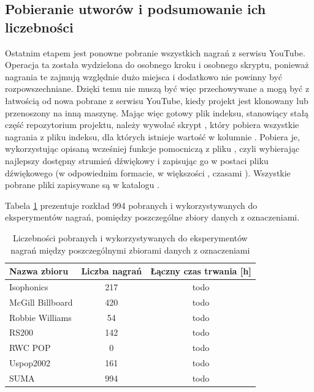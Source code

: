 \subsection{Pobieranie utworów i podsumowanie ich liczebności}
Ostatnim etapem jest ponowne pobranie wszystkich nagrań z serwisu YouTube. Operacja ta została
wydzielona do osobnego kroku i osobnego skryptu, ponieważ nagrania te zajmują względnie dużo miejsca
i dodatkowo nie powinny być rozpowszechniane. Dzięki temu nie muszą być więc przechowywane a mogą
być z łatwością od nowa pobrane z serwisu YouTube, kiedy projekt jest klonowany lub przenoszony na
inną maszynę. Mając więc gotowy plik indeksu, stanowiący stałą część repozytorium projektu, należy
wywołać skrypt , który pobiera wszystkie nagrania z
pliku indeksu, dla których istnieje wartość w kolumnie . Pobiera je, wykorzystując
opisaną wcześniej funkcje pomocniczą z pliku , czyli
wybierając najlepszy dostępny strumień dźwiękowy i zapisując go w postaci pliku dźwiękowego (w
odpowiednim formacie, w większości , czasami ). Wszystkie pobrane pliki
zapisywane są w katalogu .

Tabela \ref{tab:datasets2} prezentuje rozkład 994 pobranych i wykorzystywanych do eksperymentów
nagrań, pomiędzy poszczególne zbiory danych z oznaczeniami.

\begin{table}
    \centering
    \caption{Liczebności pobranych i wykorzystywanych do eksperymentów nagrań między poszczególnymi zbiorami danych z oznaczeniami}
    \label{tab:datasets2}
    \begin{tabular}{|l|c|c|}
        \hline
        Nazwa zbioru & Liczba nagrań & Łączny czas trwania [h] \\
        \hline
        Isophonics          & 217 & todo \\
        McGill Billboard    & 420 & todo \\
        Robbie Williams     & 54 & todo \\
        RS200               & 142 & todo \\
        RWC POP             & 0 & todo \\
        Uspop2002           & 161 & todo \\
        \hline
        SUMA                & 994 & todo \\
        \hline
    \end{tabular}
\end{table}


